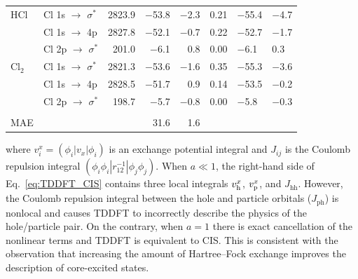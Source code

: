 \documentclass[12pt]{article}
\begin{document}
\begin{table}[!t]
\begin{tabular*}{11.5cm}{@{\extracolsep{\fill} }llrrrcHH}
    HCl       & Cl 1s $\rightarrow$ $\sigma^*$     & 2823.9 & $-$53.8     & $-$2.3 & 0.21  & $-$55.4    & $-$4.7  \\
    ~         & Cl 1s $\rightarrow$ 4p          & 2827.8 & $-$52.1      & $-$0.7 & 0.22   & $-$52.7    & $-$1.7  \\
    ~         & Cl 2p $\rightarrow$  $\sigma^*$    & 201.0 & $-$6.1 & 0.8 & 0.00   & $-$6.1    & 0.3 \\
    Cl$_2$      & Cl 1s $\rightarrow$ $\sigma^*$          & 2821.3   & $-$53.6      & $-$1.6  & 0.35 & $-$55.3    & $-$3.6   \\
    ~         & Cl 1s $\rightarrow$ 4p          & 2828.5 & $-$51.7    & 0.9 & 0.14  & $-$53.5     & $-$0.2  \\
        ~         & Cl 2p $\rightarrow$  $\sigma^*$    & 198.7 & $-$5.7     & $-$0.8 & 0.00  & $-$5.8    & $-$0.3\\\\
    MAE         &                            & ~     & 31.6      & 1.6   &  \\
    \hline
    \hline
    \end{tabular*}
     \label{table:SecondRow}
\end{table}
where $v_{i}^x = (\phi_{i}|v_x|\phi_{i})$ is an exchange potential integral and $J_{ij}$ is the Coulomb repulsion integral $(\phi_i \phi_i|r_{12}^{-1}|\phi_j \phi_j)$. When $a \ll 1$, the right-hand side of Eq.~\ref{eq:TDDFT_CIS} contains three local integrals $v_{\rm h}^x$, $v_{\rm p}^x$, and $J_{\text{hh}}$. However, the Coulomb repulsion integral between the hole and particle orbitals ($J_{\text{ph}}$) is nonlocal and causes TDDFT to incorrectly describe the physics of the hole/particle pair.
On the contrary, when $a=1$ there is exact cancellation of the nonlinear terms and TDDFT is equivalent to CIS.
This is consistent with the observation that increasing the amount of Hartree--Fock exchange improves the description of core-excited states.\cite{heyd_hybrid_2003,nakata_time-dependent_2006,song_core-excitation_2008,henderson_importance_2007,henderson_assessment_2008}
 
\end{document}

